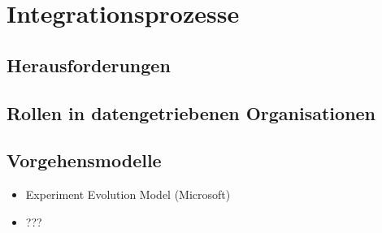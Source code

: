 \chapter[Integrationsprozesse]{Integrationsprozesse}

\section{Herausforderungen}

\section{Rollen in datengetriebenen Organisationen}

\section{Vorgehensmodelle}

\begin{itemize}
    \item Experiment Evolution Model (Microsoft)
    \item ???
\end{itemize}